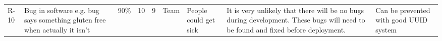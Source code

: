 \begin{tabular}{lllllllll}
R-10 & Bug in software e.g. bug says something gluten free when actually it isn’t & 90\%                                                           & 10                                                       & 9                                                            & Team                & People could get sick                                                                        & It is very unlikely that there will be no bugs during development. These bugs will need to be found and fixed before deployment.                                                                                                                                       & Can be prevented with good UUID system
\end{tabular}